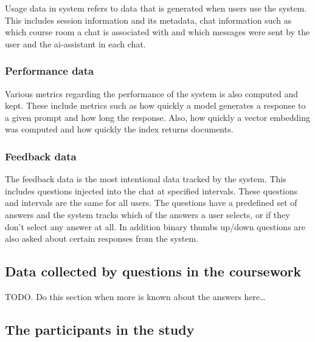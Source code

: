 Usage data in system refers to data that is generated when users use the system. This includes session information and its metadata, chat information such as which course room a chat is associated with and which messages were sent by the user and the ai-assistant in each chat.


\subsubsection{Performance data}


Various metrics regarding the performance of the system is also computed and kept. These include metrics such as how quickly a model generates a response to a given prompt and how long the response. Also, how quickly a vector embedding was computed and how quickly the index returns documents.


\subsubsection{Feedback data}
\label{sec:method_feedback_data}




The feedback data is the most intentional data tracked by the system. This includes questions injected into the chat at specified intervals. These questions and intervals are the same for all users. The questions have a predefined set of answers and the system tracks which of the answers a user selects, or if they don’t select any answer at all. In addition binary thumbs up/down questions are also asked about certain responses from the system.


\subsection{Data collected by questions in the coursework}

TODO. Do this section when more is known about the answers here…




\subsection{The participants in the study}


